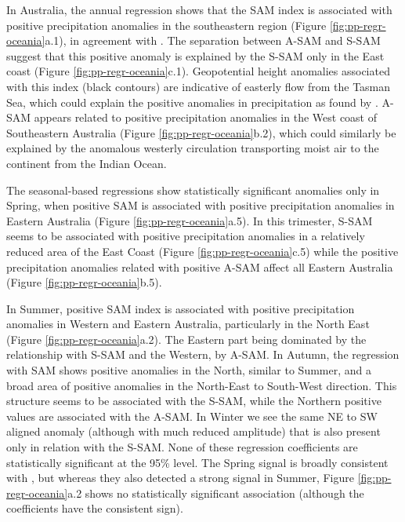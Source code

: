 \documentclass[smallextended]{svjour3}       %
\begin{document}
In Australia, the annual regression shows that the SAM index is associated with positive precipitation anomalies in the southeastern region (Figure \ref{fig:pp-regr-oceania}a.1), in agreement with \citet{gillett2006}. The separation between A\nobreakdash-SAM and S\nobreakdash-SAM suggest that this positive anomaly is explained by the S\nobreakdash-SAM only in the East coast (Figure \ref{fig:pp-regr-oceania}c.1). Geopotential height anomalies associated with this index (black contours) are indicative of easterly flow from the Tasman Sea, which could explain the positive anomalies in precipitation as found by \citet{hendon2007}. A\nobreakdash-SAM appears related to positive precipitation anomalies in the West coast of Southeastern Australia (Figure \ref{fig:pp-regr-oceania}b.2), which could similarly be explained by the anomalous westerly circulation transporting moist air to the continent from the Indian Ocean.

The seasonal-based regressions show statistically significant anomalies only in Spring, when positive SAM is associated with positive precipitation anomalies in Eastern Australia (Figure \ref{fig:pp-regr-oceania}a.5). In this trimester, S\nobreakdash-SAM seems to be associated with positive precipitation anomalies in a relatively reduced area of the East Coast (Figure \ref{fig:pp-regr-oceania}c.5) while the positive precipitation anomalies related with positive A\nobreakdash-SAM affect all Eastern Australia (Figure \ref{fig:pp-regr-oceania}b.5).

In Summer, positive SAM index is associated with positive precipitation anomalies in Western and Eastern Australia, particularly in the North East (Figure \ref{fig:pp-regr-oceania}a.2). The Eastern part being dominated by the relationship with S\nobreakdash-SAM and the Western, by A\nobreakdash-SAM. In Autumn, the regression with SAM shows positive anomalies in the North, similar to Summer, and a broad area of positive anomalies in the North-East to South-West direction. This structure seems to be associated with the S\nobreakdash-SAM, while the Northern positive values are associated with the A\nobreakdash-SAM. In Winter we see the same NE to SW aligned anomaly (although with much reduced amplitude) that is also present only in relation with the S\nobreakdash-SAM. None of these regression coefficients are statistically significant at the 95\% level. The Spring signal is broadly consistent with \citet{hendon2007}, but whereas they also detected a strong signal in Summer, Figure \ref{fig:pp-regr-oceania}a.2 shows no statistically significant association (although the coefficients have the consistent sign).
\end{document}
